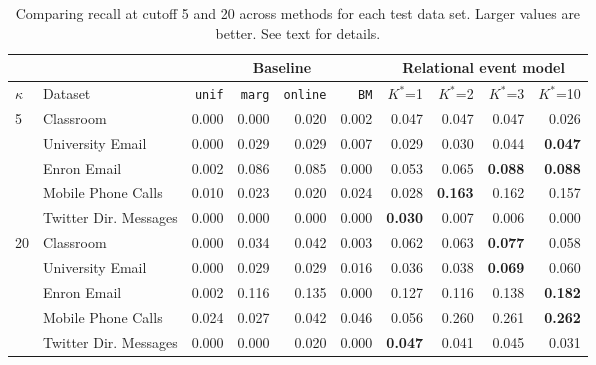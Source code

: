 \begin{table*}[t]
\begin{center}
{\footnotesize
\begin{tabular}{llrrrr|rrrr}
&& \multicolumn{4}{c|}{Baseline} & \multicolumn{4}{c}{Relational event model}\\
  \hline
$\kappa$ & Dataset & \texttt{unif} & \texttt{marg} & \texttt{online} & \texttt{BM} & $K^*$=1 & $K^*$=2 & $K^*$=3 & $K^*$=10 \\ 
  \hline
5 %
   & Classroom & 0.000 & 0.000 & 0.020 & 0.002 & 0.047 & 0.047 & 0.047 & 0.026 \\ 
   & University Email & 0.000 & 0.029 & 0.029 & 0.007 & 0.029 & 0.030 & 0.044 & \textbf{0.047} \\ 
   & Enron Email & 0.002 & 0.086 & 0.085 & 0.000 & 0.053 & 0.065 & \textbf{0.088} & \textbf{0.088} \\ 
   & Mobile Phone Calls & 0.010 & 0.023 & 0.020 & 0.024 & 0.028 & \textbf{0.163} & 0.162 & 0.157 \\ 
   & Twitter Dir. Messages & 0.000 & 0.000 & 0.000 & 0.000 & \textbf{0.030} & 0.007 & 0.006 & 0.000 \\ 
\hline 
  20%
   & Classroom & 0.000 & 0.034 & 0.042 & 0.003 & 0.062 & 0.063 & \textbf{0.077} & 0.058 \\ 
   & University Email & 0.000 & 0.029 & 0.029 & 0.016 & 0.036 & 0.038 & \textbf{0.069} & 0.060 \\ 
   & Enron Email & 0.002 & 0.116 & 0.135 & 0.000 & 0.127 & 0.116 & 0.138 & \textbf{0.182} \\ 
   & Mobile Phone Calls & 0.024 & 0.027 & 0.042 & 0.046 & 0.056 & 0.260 & 0.261 & \textbf{0.262} \\ 
   & Twitter Dir. Messages & 0.000 & 0.000 & 0.020 & 0.000 & \textbf{0.047} & 0.041 & 0.045 & 0.031 \\ 
   \hline
\end{tabular}
}
\caption{Comparing recall at cutoff 5 and 20 across methods for each test data set.  Larger values are better.  See text for details.}
\label{tab:recall20}
\end{center}
\end{table*}
